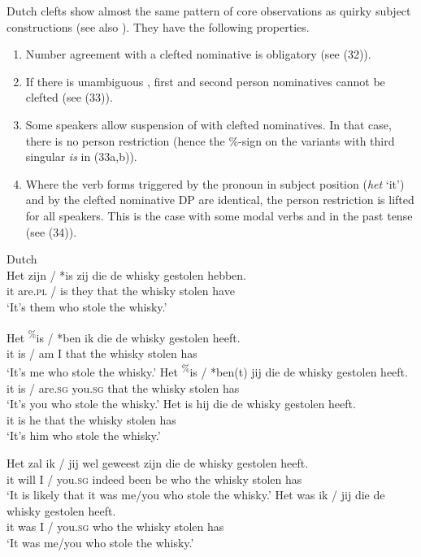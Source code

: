 \documentclass[output=paper]{langsci/langscibook}
\begin{document}
Dutch clefts show almost the same pattern of core observations as  quirky subject constructions (see also \citealt{Dikken2014}). They have the following properties. 

\begin{enumerate}[label=(\roman*)]
\item  Number agreement with a clefted nominative is obligatory (see (32)). 
\item  If there is unambiguous , first and second person nominatives cannot be clefted (see (33)). 
\item Some speakers allow suspension of  with clefted nominatives. In that case, there is no person restriction (hence the \%-sign on the variants with third singular \textit{is} in (33a,b)). 
\item  Where the verb forms triggered by the pronoun in subject position (\textit{het} ‘it’) and by the clefted nominative DP are identical, the person restriction is lifted for all speakers. This is the case with some modal verbs and in the past tense (see (34)).
\end{enumerate}

\ea \label{bkm:Ref295486016}  Dutch\\
 \gll Het zijn / *is   zij   die   de whisky gestolen hebben.\\
    it    are.\textsc{pl} / is they that the whisky stolen     have\\
\glt   ‘It’s them who stole the whisky.’  
\z

\ea \label{bkm:Ref295486091}  
\ea \gll Het \textsuperscript{\%}is / *ben ik die  de  whisky gestolen heeft.\\
    it       is / am    I  that the whisky stolen      has\\
\glt    ‘It’s me who stole the whisky.’
\ex 
\gll Het \textsuperscript{\%}is / *ben(t) jij         die  de  whisky gestolen heeft.\\
    it      is / are.\textsc{sg}   you.\textsc{sg} that the whisky stolen      has\\
\glt    ‘It’s you who stole the whisky.’
\ex 
\gll Het is hij die  de  whisky gestolen heeft.\\
    it     is he that the whisky stolen     has\\
\glt  ‘It’s him who stole the whisky.’
\z
\z


\ea \label{bkm:Ref295486338}  
\ea \gll Het zal  ik / jij      wel      geweest zijn die  de  whisky gestolen heeft.\\
    it    will I / you.\textsc{sg} indeed been      be   who the whisky stolen     has\\
\glt    ‘It is likely that it was me/you who stole the whisky.’
\ex \gll  Het was ik / jij        die  de  whisky gestolen heeft.\\
    it     was I / you.\textsc{sg} who the whisky stolen      has\\
\glt  ‘It was me/you who stole the whisky.’
\z
\z
\end{document}
